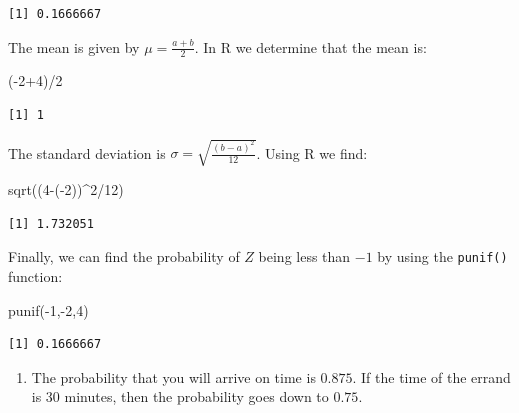 \documentclass[
  letterpaper,
  DIV=11,
  numbers=noendperiod]{scrreprt}
\newenvironment{Shaded}{\begin{snugshade}}{\end{snugshade}}
\newcommand{\DecValTok}[1]{\textcolor[rgb]{0.68,0.00,0.00}{#1}}
\newcommand{\FunctionTok}[1]{\textcolor[rgb]{0.28,0.35,0.67}{#1}}
\newcommand{\NormalTok}[1]{\textcolor[rgb]{0.00,0.23,0.31}{#1}}
\newcommand{\SpecialCharTok}[1]{\textcolor[rgb]{0.37,0.37,0.37}{#1}}
\providecommand{\tightlist}{%
  \setlength{\itemsep}{0pt}\setlength{\parskip}{0pt}}\usepackage{longtable,booktabs,array}
\begin{document}
\begin{verbatim}
[1] 0.1666667
\end{verbatim}

The mean is given by \(\mu = \frac{a+b}{2}\). In R we determine that the
mean is:

\begin{Shaded}
\begin{Highlighting}[numbers=left,,]
\NormalTok{(}\SpecialCharTok{{-}}\DecValTok{2}\SpecialCharTok{+}\DecValTok{4}\NormalTok{)}\SpecialCharTok{/}\DecValTok{2}
\end{Highlighting}
\end{Shaded}

\begin{verbatim}
[1] 1
\end{verbatim}

The standard deviation is \(\sigma = \sqrt {\frac{(b-a)^2}{12}}\). Using
R we find:

\begin{Shaded}
\begin{Highlighting}[numbers=left,,]
\FunctionTok{sqrt}\NormalTok{((}\DecValTok{4}\SpecialCharTok{{-}}\NormalTok{(}\SpecialCharTok{{-}}\DecValTok{2}\NormalTok{))}\SpecialCharTok{\^{}}\DecValTok{2}\SpecialCharTok{/}\DecValTok{12}\NormalTok{)}
\end{Highlighting}
\end{Shaded}

\begin{verbatim}
[1] 1.732051
\end{verbatim}

Finally, we can find the probability of \(Z\) being less than \(-1\) by
using the \texttt{punif()} function:

\begin{Shaded}
\begin{Highlighting}[numbers=left,,]
\FunctionTok{punif}\NormalTok{(}\SpecialCharTok{{-}}\DecValTok{1}\NormalTok{,}\SpecialCharTok{{-}}\DecValTok{2}\NormalTok{,}\DecValTok{4}\NormalTok{)}
\end{Highlighting}
\end{Shaded}

\begin{verbatim}
[1] 0.1666667
\end{verbatim}

\begin{blackbox}

\begin{enumerate}
\def\labelenumi{\arabic{enumi}.}
\setcounter{enumi}{1}
\tightlist
\item
  The probability that you will arrive on time is \(0.875\). If the time
  of the errand is 30 minutes, then the probability goes down to
  \(0.75\).
\end{enumerate}

\end{blackbox}
\end{document}
